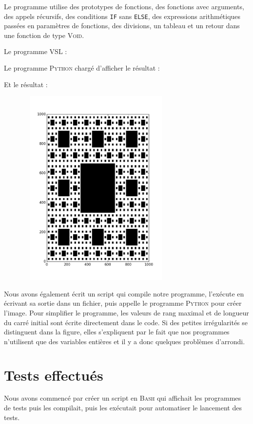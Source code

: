 \documentclass[french]{article}
\begin{document}
Le programme utilise des prototypes de fonctions, des fonctions avec arguments, des appels récursifs, des conditions \texttt{IF} sans \texttt{ELSE}, des expressions arithmétiques passées en paramètres de fonctions, des divisions, un tableau et un retour dans une fonction de type \textsc{Void}.

Le programme \textsc{VSL} :



Le programme \textsc{Python} chargé d'afficher le résultat :


Et le résultat :

\begin{center}
\includegraphics[width=10cm, height=10cm]{../sierpinski.png}
\end{center}

Nous avons également écrit un script qui compile notre programme, l'exécute en écrivant sa sortie dans un fichier, puis appelle le programme \textsc{Python} pour créer l'image. Pour simplifier le programme, les valeurs de rang maximal et de longueur du carré initial sont écrite directement dans le code. Si des petites irrégularités se distinguent dans la figure, elles s'expliquent par le fait que nos programmes n'utilisent que des variables entières et il y a donc quelques problèmes d'arrondi.

\section{Tests effectués}
Nous avons commencé par créer un script en \textsc{Bash} qui affichait les programmes de tests puis les compilait, puis les exécutait pour automatiser le lancement des tests.
\end{document}
